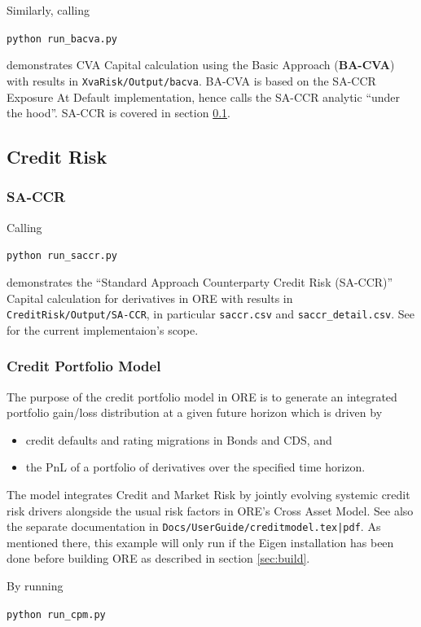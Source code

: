 \medskip
Similarly, calling
\medskip
\centerline {\tt python run\_bacva.py}

\medskip
demonstrates CVA Capital calculation using the Basic Approach ({\bf BA-CVA}) with results in
{\tt XvaRisk/Output/bacva}. BA-CVA is based on the SA-CCR Exposure At Default implementation,
hence calls the SA-CCR analytic ``under the hood''. SA-CCR is covered in section
\ref{example:creditrisk}.

\subsection{Credit Risk}\label{example:creditrisk}

\subsubsection{SA-CCR}\label{example:creditrisk_saccr}

Calling
\medskip
\centerline {\tt python run\_saccr.py}

\medskip
demonstrates the ``Standard Approach Counterparty Credit Risk (SA-CCR)'' Capital calculation for
derivatives in ORE with results in {\tt CreditRisk/Output/SA-CCR}, in particular {\tt saccr.csv}
and {\tt saccr\_detail.csv}. See \cite{methods} for the current implementaion's scope.

\subsubsection{Credit Portfolio Model}\label{example:creditrisk_cpm}

The purpose of the credit portfolio model in ORE is to generate an integrated portfolio gain/loss distribution
at a given future horizon which is driven by
\begin{itemize}
\item credit defaults and rating migrations in Bonds and CDS, and
\item the PnL of a portfolio of derivatives over the specified time horizon.
\end{itemize}
The model integrates Credit and Market Risk by jointly evolving systemic credit risk drivers
alongside the usual risk factors in ORE's Cross Asset Model.
See also the separate documentation in {\tt Docs/UserGuide/creditmodel.tex|pdf}.
As mentioned there, this example will only run if the Eigen installation has been done before building ORE as described in section \ref{sec:build}.

By running \\
\medskip
\centerline{{\tt python run\_cpm.py}}

